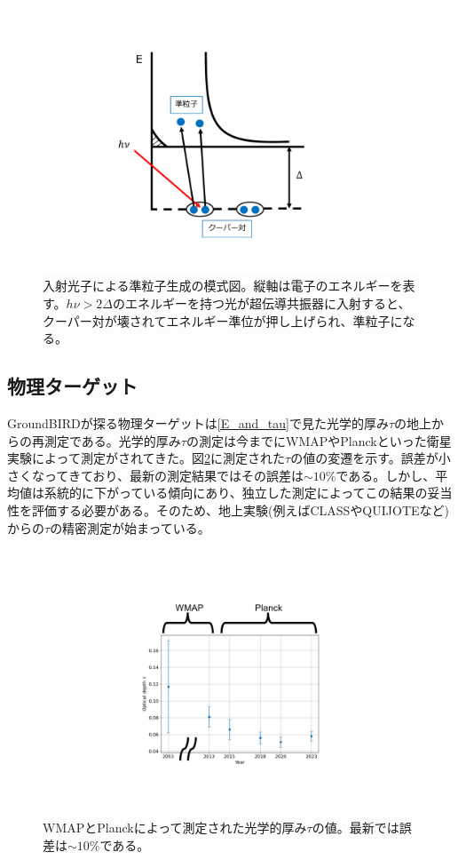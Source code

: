 \begin{figure}[htbp]
  \centering
  \includegraphics[width=0.6\columnwidth]{3_GB/figs/cooper.pdf}
  \caption{入射光子による準粒子生成の模式図。縦軸は電子のエネルギーを表す。$h\nu > 2\Delta$のエネルギーを持つ光が超伝導共振器に入射すると、クーパー対が壊されてエネルギー準位が押し上げられ、準粒子になる。}
  \label{cooper}
\end{figure}

\subsection{物理ターゲット}
GroundBIRDが探る物理ターゲットは\ref{E_and_tau}で見た光学的厚み$\tau$の地上からの再測定である。光学的厚み$\tau$の測定は今までにWMAPやPlanckといった衛星実験によって測定がされてきた。図\ref{tau_planck}に測定された$\tau$の値の変遷を示す。誤差が小さくなってきており、最新の測定結果ではその誤差は$\sim 10\%$である。しかし、平均値は系統的に下がっている傾向にあり、独立した測定によってこの結果の妥当性を評価する必要がある。そのため、地上実験(例えばCLASS\cite{CLASS}やQUIJOTE\cite{QUIJOTE}など)からの$\tau$の精密測定が始まっている。

\begin{figure}[htbp]
  \centering
  \includegraphics[width=0.8\columnwidth]{3_GB/figs/tau_planck_wmap_cut.pdf}
  \caption{WMAPとPlanckによって測定された光学的厚み$\tau$の値\cite{tau_measure}。最新では誤差は$\sim 10\%$である。}
  \label{tau_planck}
\end{figure}

